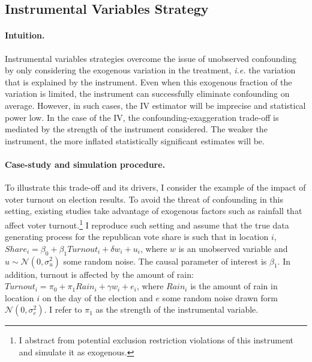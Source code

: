 \documentclass[usletter, 12pt]{article}
\begin{document}
		
        		\subsection{Instrumental Variables Strategy}\label{sim_IV}
            
                		\paragraph{Intuition.} 
        			Instrumental variables strategies overcome the issue of unobserved confounding by only considering the exogenous variation in the treatment, \textit{i.e.} the variation that is explained by the instrument. Even when this exogenous fraction of the variation is limited, the instrument can successfully eliminate confounding on average. However, in such cases, the IV estimator will be imprecise and statistical power low. In the case of the IV, the confounding-exaggeration trade-off is mediated by the strength of the instrument considered. The weaker the instrument, the more inflated statistically significant estimates will be.
        		
        			\paragraph{Case-study and simulation procedure.} 
        			To illustrate this trade-off and its drivers, I consider the example of the impact of voter turnout on election results. To avoid the threat of confounding in this setting, existing studies take advantage of exogenous factors such as rainfall that affect voter turnout.\footnote{I abstract from potential exclusion restriction violations of this instrument and simulate it as exogenous.} I reproduce such setting and assume that the true data generating process for the republican vote share is such that  in location $i$, $Share_{i} = \beta_{0} + \beta_{1} Turnout_{i} + \delta w_{i} + u_{i}$, where $w$ is an unobserved variable and $u \sim \mathcal{N}(0, \sigma_{u}^{2})$ some random noise. The causal parameter of interest is $\beta_{1}$. In addition, turnout is affected by the amount of rain: $Turnout_{i} = \pi_{0} + \pi_{1} Rain_{i} + \gamma w_{i} + e_{i}$, where $Rain_{i}$ is the amount of rain in location $i$ on the day of the election 
			and $e$ some random noise drawn form $\mathcal{N}(0, \sigma_{e}^{2})$. I refer to $\pi_{1}$ as the strength of the instrumental variable. 
        			
\end{document}
